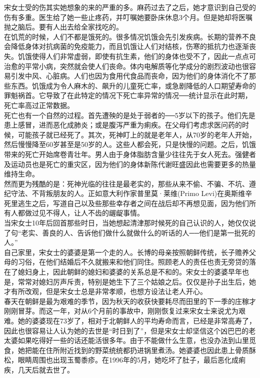\begin{multicols}{\theparacolNo}
宋女士受的伤其实她想象的来的严重的多。麻药过去了之后，她才意识到自己受的伤有多重。医生给了她一些止疼药，并叮嘱她要卧床休息3个月。但是她却将医嘱抛之脑后。要有人出去给全家找吃的。\\

在饥荒的时候，人们不都是饿死的。很多情况饥饿会先引发疾病。长期的营养不良会降低身体对抗病菌的免疫能力，而且饥饿让人们对结核，伤寒的抵抗力也逐渐丧失。饥饿使得人们非常虚弱，即使有抗生素，他们的身体也受不了，因此一点点可治愈的平常小病，突然就会使人们丧命。体内电解质等化学成分的剧烈波动也很容易引发中风、心脏病。人们也因为食用代食品而丧命，因为他们的身体消化不了那些东西。饥饿成为令人麻木的、飙升的儿童死亡率，或急剧降低的人口期望寿命的罪魁祸首。它导致了在此特定的情况下死亡率异常的情况──统计显示在此时期，死亡率高过正常数据。\\

死亡也有一个自然的过程。首先遭殃的是处于弱者的──5岁以下的孩子。他们先是患上感冒，进而恶化成肺炎；或是腹泻严重为痢疾。在父母们考虑求医问药的时候，可能孩子就已经死了。其次，死神盯上的就是老年人，从70岁的老年人开始，然后慢慢降至60岁甚至是50岁的人。这些人都会死，只是快慢的问题。之后，饥饿带来的死亡开始席卷青壮年。男人由于身体脂肪含量少往往先于女人死去。强健者及运动员也是死亡的重灾区，因为他们的身体新陈代谢旺盛因此也需要更多的热量维持生命。\\

然而更为残酷的是：死神光临的往往是最老实的，那些从来不偷、不骗、不坑、遵纪守法、不背叛朋友的人。正如意大利作家普里莫·莱维(Primo Levi)在奥斯维辛死里逃生之后，写道自己以及些那些幸存者之间在战后却不再想见面，因为他们所有人都做过见不得人，让人不齿的龌龊事情。\\

当宋女士10年后回首那些时日，当她想起清津那时候死的自己认识的人，她仅仅说了句“老实、善良的人、告诉他们做什么就做什么的听话的人──他们是第一批死的人。”\\

自己家里，宋女士的婆婆是第一个走的人。长博的母亲按照朝鲜传统，长子赡养父母的习俗，在他们结婚后不久就搬来和他们同住。照顾老人的责任也责无旁贷的落在了媳妇身上，因此朝鲜的媳妇和婆婆的关系总是不和的。宋女士的婆婆早年也是，常常对媳妇厉声斥责，特别是她生下了三个姑娘之后。仅仅是孙子出生后，她才有所改观，但是宋女士总是非常孝顺，也想方设法让老人开心。\\

春天在朝鲜是最为艰难的季节，因为秋天的收获快要耗尽而田里的下一季的庄稼才刚刚冒芽。而这一年，对从6个月前的事故中，刚刚恢复过来宋女士来说尤为艰难。她的婆婆现在73岁了，相对于北朝鲜人的平均寿命而言，已经是非常高寿了，因此也很容易让人认为她的去世是“时日到了”，但是宋女士却坚信这个凶巴巴的老太婆如果吃得好一些的话还能活很多年。由于不能做什么生意，也没办法到山里觅食，她把能在住所附近找到的野菜统统都扔进锅里煮汤。她婆婆也因此患上骨质酥松，眼睛周围也出现玉蜀黍疹。在1996年的5月，她吃坏了肚子，最后恶化成痢疾，几天后就去世了。\\


\end{multicols}
